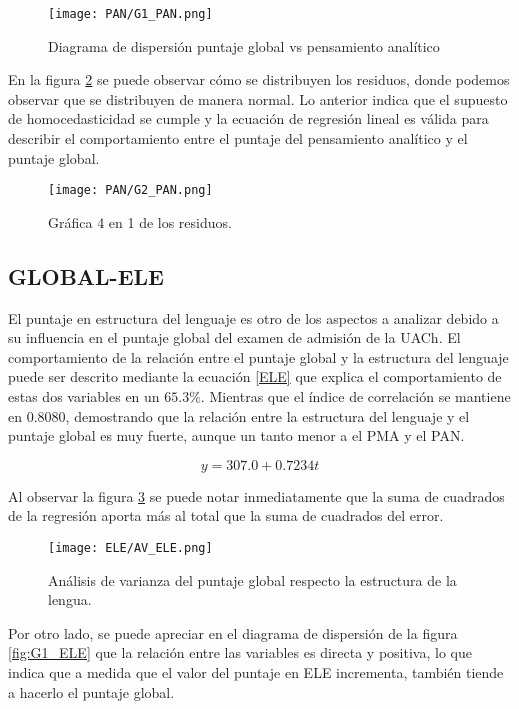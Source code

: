 \documentclass{article}
\begin{document}
\begin{figure}[H]
    \centering
    \texttt{[image: PAN/G1\_PAN.png]}
    \caption{Diagrama de dispersión puntaje global vs pensamiento analítico}
    \label{fig:G1_PAN}
\end{figure}

En la figura \ref{fig:G2_PAN} se puede observar cómo se distribuyen los residuos, donde podemos observar que se distribuyen de manera normal. Lo anterior indica que el supuesto de homocedasticidad se cumple y la ecuación de regresión lineal es válida para describir el comportamiento entre el puntaje del pensamiento analítico y el puntaje global.

\begin{figure}[H]
    \centering
    \texttt{[image: PAN/G2\_PAN.png]}
    \caption{Gráfica 4 en 1 de los residuos.}
    \label{fig:G2_PAN}
\end{figure}

\subsection{GLOBAL-ELE}

El puntaje en estructura del lenguaje es otro de los aspectos a analizar debido a su influencia en el puntaje global del examen de admisión de la UACh. El comportamiento de la relación entre el puntaje global y la estructura del lenguaje puede ser descrito mediante la ecuación \ref{ELE} que explica el comportamiento de estas dos variables en un $65.3\%$. Mientras que el índice de correlación se mantiene en $0.8080$, demostrando que la relación entre la estructura del lenguaje y el puntaje global es muy fuerte, aunque un tanto menor a el PMA y el PAN.

\begin{equation}
    y = 307.0 + 0.7234t
    \label{ELE}
\end{equation}

Al observar la figura \ref{fig:AV_ELE} se puede notar inmediatamente que la suma de cuadrados de la regresión aporta más al total que la suma de cuadrados del error.

\begin{figure}[H]
    \centering
    \texttt{[image: ELE/AV\_ELE.png]}
    \caption{Análisis de varianza del puntaje global respecto la estructura de la lengua.}
    \label{fig:AV_ELE}
\end{figure}

Por otro lado, se puede apreciar en el diagrama de dispersión de la figura \ref{fig:G1_ELE} que la relación entre las variables es directa y positiva, lo que indica que a medida que el valor del puntaje en ELE incrementa, también tiende a hacerlo el puntaje global.
\end{document}

